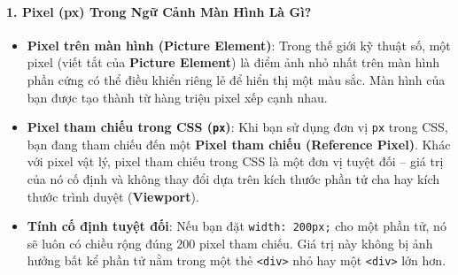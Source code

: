 \documentclass[11pt,oneside]{book}
\newcommand{\codeinline}[1]{\textcolor{accentOrange}{\texttt{#1}}}
\newcommand{\term}[1]{\textbf{\textcolor{primaryBlue}{#1}}}
\begin{document}
\paragraph{1. Pixel (px) Trong Ngữ Cảnh Màn Hình Là Gì?}

\begin{conceptBox}
\begin{itemize}[leftmargin=1.5em, itemsep=3pt, parsep=0pt]
    \item \textbf{Pixel trên màn hình (Picture Element)}: Trong thế giới kỹ thuật số, một pixel (viết tắt của \term{Picture Element}) là điểm ảnh nhỏ nhất trên màn hình phần cứng có thể điều khiển riêng lẻ để hiển thị một màu sắc. Màn hình của bạn được tạo thành từ hàng triệu pixel xếp cạnh nhau.
    \item \textbf{Pixel tham chiếu trong CSS (\codeinline{px})}: Khi bạn sử dụng đơn vị \codeinline{px} trong CSS, bạn đang tham chiếu đến một \term{Pixel tham chiếu (Reference Pixel)}. Khác với pixel vật lý, pixel tham chiếu trong CSS là một đơn vị tuyệt đối -- giá trị của nó cố định và không thay đổi dựa trên kích thước phần tử cha hay kích thước trình duyệt (\term{Viewport}).
    \item \textbf{Tính cố định tuyệt đối}: Nếu bạn đặt \codeinline{width: 200px;} cho một phần tử, nó sẽ luôn có chiều rộng đúng $200$ pixel tham chiếu. Giá trị này không bị ảnh hưởng bất kể phần tử nằm trong một thẻ \codeinline{<div>} nhỏ hay một \codeinline{<div>} lớn hơn.
\end{itemize}
\end{conceptBox}
\end{document}
